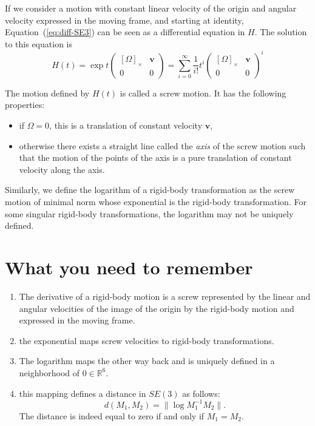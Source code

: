 \documentclass{article}
\newcommand\vect[1]{\mathbf{#1}}
\newcommand\reals{\mathbb{R}}
\begin{document}
If we consider a motion with constant linear velocity of the origin and angular velocity expressed in the moving frame, and starting at identity, Equation~(\ref{eq:diff-SE3}) can be seen as a differential equation in $H$. The solution to this equation is
$$
H(t) = \exp t \left(\begin{array}{cc} \left[\Omega\right]_{\times} & \vect{v}\\0 & 0\end{array}\right)
  = \sum_{i=0}^{\infty}\frac{1}{i!}t^i \left(\begin{array}{cc} \left[\Omega\right]_{\times} & \vect{v}\\0 & 0\end{array}\right)^i
$$

The motion defined by $H(t)$ is called a screw motion. It has the following properties:
\begin{itemize}
\item if $\Omega = 0$, this is a translation of constant velocity $\vect{v}$,
\item otherwise there exists a straight line called the \textit{axis} of the screw motion such that the motion of the points of the axis is a pure translation of constant velocity along the axis.
\end{itemize}

Similarly, we define the logarithm of a rigid-body transformation as the screw motion of minimal norm whose exponential is the rigid-body transformation. For some singular rigid-body transformations, the logarithm may not be uniquely defined.

\section{What you need to remember}

\begin{enumerate}
\item The derivative of a rigid-body motion is a screw represented by the linear and angular velocities of the image of the origin by the rigid-body motion and expressed in the moving frame.
\item the exponential maps screw velocities to rigid-body transformations.
\item The logarithm maps the other way back and is uniquely defined in a neighborhood of $0\in\reals^6$.
\item this mapping defines a distance in $SE(3)$ as follows:
  $$d(M_1,M_2) = \|\log M_1^{-1}M_2 \|.$$
The distance is indeed equal to zero if and only if $M_1=M_2$.
\end{enumerate}
\end{document}
